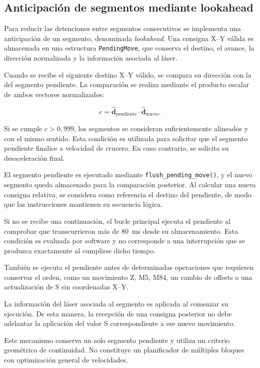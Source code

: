 \documentclass[blue,fullpaper]{ludusofficial}  %
\begin{document}
\subsection{Anticipación de segmentos mediante lookahead}

Para reducir las detenciones entre segmentos consecutivos
se implementa una anticipación de un segmento,
denominada \textit{lookahead}. Una consigna X--Y válida
es almacenada en una estructura \texttt{PendingMove},
que conserva el destino, el avance, la dirección
normalizada y la información asociada al láser.

Cuando se recibe el siguiente destino X--Y válido,
se compara su dirección con la del segmento pendiente.
La comparación se realiza mediante el producto escalar
de ambos vectores normalizados:

\[
c = \hat{\mathbf{d}}_{\mathrm{pendiente}}
    \cdot \hat{\mathbf{d}}_{\mathrm{nuevo}}.
\]

Si se cumple $c > 0{,}999$, los segmentos se consideran
suficientemente alineados y con el mismo sentido.
Esta condición es utilizada para solicitar que
el segmento pendiente finalice a velocidad de crucero.
En caso contrario, se solicita su desaceleración final.

El segmento pendiente es ejecutado mediante
\texttt{flush\_pending\_move()}, y el nuevo segmento
queda almacenado para la comparación posterior.
Al calcular una nueva consigna relativa, se considera
como referencia el destino del pendiente, de modo
que las instrucciones mantienen su secuencia lógica.

Si no se recibe una continuación, el bucle principal
ejecuta el pendiente al comprobar que transcurrieron
más de 80~ms desde su almacenamiento. Esta condición
es evaluada por software y no corresponde a una
interrupción que se produzca exactamente al cumplirse
dicho tiempo.

También se ejecuta el pendiente antes de determinadas
operaciones que requieren conservar el orden,
como un movimiento Z, M5, M84, un cambio de offsets
o una actualización de S sin coordenadas X--Y.

La información del láser asociada al segmento es aplicada
al comenzar su ejecución. De esta manera, la recepción
de una consigna posterior no debe adelantar la aplicación
del valor S correspondiente a ese nuevo movimiento.

Este mecanismo conserva un solo segmento pendiente
y utiliza un criterio geométrico de continuidad.
No constituye un planificador de múltiples bloques
con optimización general de velocidades.
\end{document}
